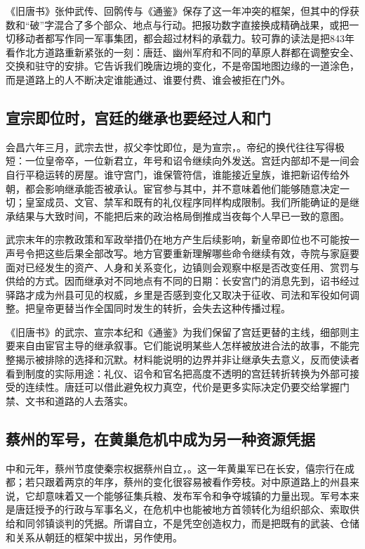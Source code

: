 《旧唐书》张仲武传、回鹘传与《通鉴》保存了这一年冲突的框架，但其中的俘获数和“破”字混合了多个部众、地点与行动。把报功数字直接换成精确战果，或把一切移动者都写作同一军事集团，都会超过材料的承载力。较可靠的读法是把843年看作北方道路重新紧张的一刻：唐廷、幽州军府和不同的草原人群都在调整安全、交换和驻守的安排。它告诉我们晚唐边境的变化，不是帝国地图边缘的一道涂色，而是道路上的人不断决定谁能通过、谁要付费、谁会被拒在门外。

\subsection{宣宗即位时，宫廷的继承也要经过人和门}
会昌六年三月，武宗去世，叔父李忱即位，是为宣宗，。帝纪的换代往往写得极短：一位皇帝卒，一位新君立，年号和诏令继续向外发送。宫廷内部却不是一间会自行平稳运转的房屋。谁守宫门，谁保管符信，谁能接近皇族，谁把新诏传给外朝，都会影响继承能否被承认。宦官参与其中，并不意味着他们能够随意决定一切；皇室成员、文官、禁军和既有的礼仪程序同样构成限制。我们所能确证的是继承结果与大致时间，不能把后来的政治格局倒推成当夜每个人早已一致的意图。

武宗末年的宗教政策和军政举措仍在地方产生后续影响，新皇帝即位也不可能按一声号令把这些后果全部改写。地方官要重新理解哪些命令继续有效，寺院与家庭要面对已经发生的资产、人身和关系变化，边镇则会观察中枢是否改变任用、赏罚与供给的方式。因而继承对不同地点有不同的日期：长安宫门的消息先到，诏书经过驿路才成为州县可见的权威，乡里是否感到变化又取决于征收、司法和军役如何调整。把皇帝更替当作全国同时发生的转折，会失去这种传播过程。

《旧唐书》的武宗、宣宗本纪和《通鉴》为我们保留了宫廷更替的主线，细部则主要来自由宦官主导的继承叙事。它们能说明某些人怎样被放进合法的故事，不能完整揭示被排除的选择和沉默。材料能说明的边界并非让继承失去意义，反而使读者看到制度的实际用途：礼仪、诏令和官名把高度不透明的宫廷转折转换为外部可接受的连续性。唐廷可以借此避免权力真空，代价是更多实际决定仍要交给掌握门禁、文书和道路的人去落实。

\subsection{蔡州的军号，在黄巢危机中成为另一种资源凭据}
中和元年，蔡州节度使秦宗权据蔡州自立，。这一年黄巢军已在长安，僖宗行在成都；若只跟着两京的年序，蔡州的变化很容易被看作旁枝。对中原道路上的州县来说，它却意味着又一个能够征集兵粮、发布军令和争夺城镇的力量出现。军号本来是唐廷授予的行政与军事名义，在危机中也能被地方首领转化为组织部众、索取供给和同邻镇谈判的凭据。所谓自立，不是凭空创造权力，而是把既有的武装、仓储和关系从朝廷的框架中拔出，另作使用。

